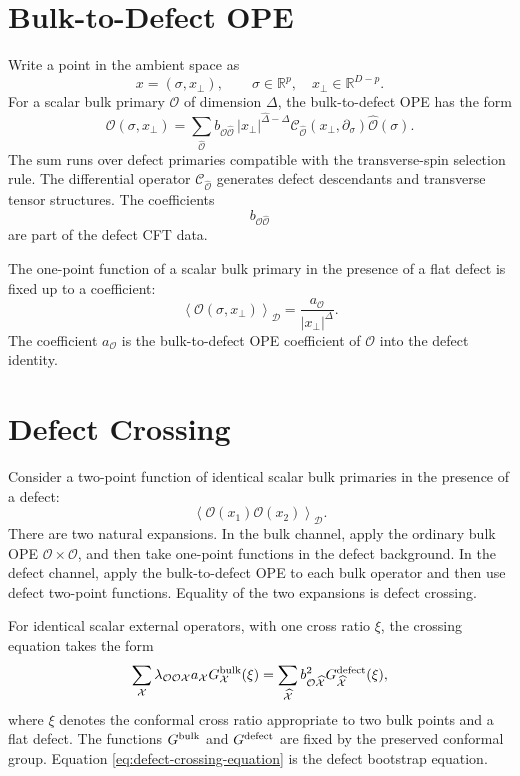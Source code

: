 \section{Bulk-to-Defect OPE}

Write a point in the ambient space as
\[
  x=(\sigma,x_\perp),
  \qquad
  \sigma\in\mathbb R^p,
  \quad
  x_\perp\in\mathbb R^{D-p}.
\]
For a scalar bulk primary \(\mathcal O\) of dimension \(\Delta\), the
bulk-to-defect OPE has the form
\begin{equation}
  \mathcal O(\sigma,x_\perp)
  =
  \sum_{\widehat{\mathcal O}}
  b_{\mathcal O\widehat{\mathcal O}}\,
  |x_\perp|^{\widehat\Delta-\Delta}
  \mathcal C_{\widehat{\mathcal O}}(x_\perp,\partial_\sigma)
  \widehat{\mathcal O}(\sigma).
  \label{eq:bulk-to-defect-ope}
\end{equation}
The sum runs over defect primaries compatible with the transverse-spin
selection rule.  The differential operator
\(\mathcal C_{\widehat{\mathcal O}}\) generates defect descendants and
transverse tensor structures.  The coefficients
\[
  b_{\mathcal O\widehat{\mathcal O}}
\]
are part of the defect CFT data.

The one-point function of a scalar bulk primary in the presence of a flat
defect is fixed up to a coefficient:
\[
  \left\langle\mathcal O(\sigma,x_\perp)\right\rangle_{\mathcal D}
  =
  \frac{a_{\mathcal O}}{|x_\perp|^\Delta}.
\]
The coefficient \(a_{\mathcal O}\) is the bulk-to-defect OPE coefficient of
\(\mathcal O\) into the defect identity.

\section{Defect Crossing}

Consider a two-point function of identical scalar bulk primaries in the
presence of a defect:
\[
  \left\langle
    \mathcal O(x_1)\mathcal O(x_2)
  \right\rangle_{\mathcal D}.
\]
There are two natural expansions.  In the bulk channel, apply the ordinary
bulk OPE \(\mathcal O\times\mathcal O\), and then take one-point functions in
the defect background.  In the defect channel, apply the bulk-to-defect OPE to
each bulk operator and then use defect two-point functions.  Equality of the
two expansions is defect crossing.

For identical scalar external operators, with one cross ratio \(\xi\), the
crossing equation takes the form
\begin{equation}
  \sum_{\mathcal X}
  \lambda_{\mathcal O\mathcal O\mathcal X}
  a_{\mathcal X}
  G_{\mathcal X}^{\rm bulk}(\xi)
  =
  \sum_{\widehat{\mathcal X}}
  b_{\mathcal O\widehat{\mathcal X}}^2
  G_{\widehat{\mathcal X}}^{\rm defect}(\xi),
  \label{eq:defect-crossing-equation}
\end{equation}
where \(\xi\) denotes the conformal cross ratio appropriate to two bulk
points and a flat defect.  The functions \(G^{\rm bulk}\) and
\(G^{\rm defect}\) are fixed by the preserved conformal group.  Equation
\eqref{eq:defect-crossing-equation} is the defect bootstrap equation.

